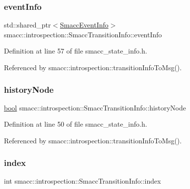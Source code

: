 \subsubsection{\texorpdfstring{event\+Info}{eventInfo}}
{\footnotesize\ttfamily std\+::shared\+\_\+ptr$<$\hyperlink{structsmacc_1_1introspection_1_1SmaccEventInfo}{Smacc\+Event\+Info}$>$ smacc\+::introspection\+::\+Smacc\+Transition\+Info\+::event\+Info}



Definition at line 57 of file smacc\+\_\+state\+\_\+info.\+h.



Referenced by smacc\+::introspection\+::transition\+Info\+To\+Msg().

\mbox{\label{structsmacc_1_1introspection_1_1SmaccTransitionInfo_acbb8f7891dd0c541b26feb82149cb780}} 
\subsubsection{\texorpdfstring{history\+Node}{historyNode}}
{\footnotesize\ttfamily \hyperlink{classbool}{bool} smacc\+::introspection\+::\+Smacc\+Transition\+Info\+::history\+Node}



Definition at line 50 of file smacc\+\_\+state\+\_\+info.\+h.



Referenced by smacc\+::introspection\+::transition\+Info\+To\+Msg().

\mbox{\label{structsmacc_1_1introspection_1_1SmaccTransitionInfo_a4b9e9f140aefd8ecd6697bcaa4b681af}} 
\subsubsection{\texorpdfstring{index}{index}}
{\footnotesize\ttfamily int smacc\+::introspection\+::\+Smacc\+Transition\+Info\+::index}



